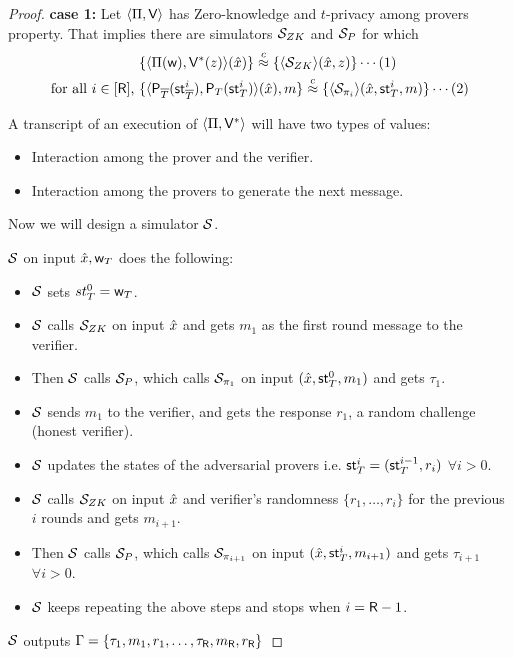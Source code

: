 \begin{proof}
	\textbf{case 1:} Let $\langle \Pi,\mathsf{V}\rangle$ has Zero-knowledge and $t$-privacy among provers property. That implies there are simulators $\mathcal{S}_{ZK}$ and $\mathcal{S}_{P}$ for which 
	\begin{align*}
		&\{ \langle  \Pi( \mathsf{w} ) , \mathsf{V}^*( z ) \rangle ( \hat{x}) \} \stackrel{c}{\approx} \{ \langle \mathcal{S}_{ZK} \rangle(\hat{x}, z) \} \cdots (1)\\		
		\text{for all }i \in [\mathsf{R}] \text{, } &\{ \langle  \mathsf{P}_{\overline{T}}( \mathsf{st}^i_{\overline{T}} ) , \mathsf{P}_T ( \mathsf{st}^i_T ) \rangle ( \hat{x} ) , m \}
	 \stackrel{c}{\approx} \{ \langle \mathcal{S}_{\pi_i} \rangle (\hat{x}, \mathsf{st}^i_T, m) \} \cdots (2)
	\end{align*}
	
	A transcript of an execution of $\langle \Pi,\mathsf{V}^*\rangle$ will have two types of values:

	\begin{itemize}
		\item Interaction among the prover and the verifier.
		\item Interaction among the provers to generate the next message.		
	\end{itemize}
	Now we will design a simulator $\mathcal{S}$.
	
	$\mathcal{S}$ on input $\hat{x}, \mathsf{w}_T$ does the following: 
	\begin{itemize}
		\item $\mathcal{S}$ sets $st^0_T = \mathsf{w}_T$.
		\item $\mathcal{S}$ calls $\mathcal{S}_{ZK}$ on input $\hat{x}$ and gets $m_{1}$ as the first round message to the verifier.
		\item Then $\mathcal{S}$ calls $\mathcal{S}_{P}$, which calls $\mathcal{S}_{\pi_1}$ on input $(\hat{x}, \mathsf{st}^0_T , m_{1})$ and gets $\tau_{1}$.
		\item $\mathcal{S}$ sends $m_1$ to the verifier, and gets the response $r_1$, a random challenge (honest verifier).
		\item $\mathcal{S}$ updates the states of the adversarial provers i.e. $\mathsf{st}^i_T = (\mathsf{st}^{i-1}_T, r_i)$ $\forall i>0$.
		\item $\mathcal{S}$ calls $\mathcal{S}_{ZK}$ on input $\hat{x}$ and verifier's randomness $\{r_1, \ldots, r_i\}$ for the previous $i$ rounds and gets $m_{i+1}$.
		\item Then $\mathcal{S}$ calls $\mathcal{S}_{P}$, which calls $\mathcal{S}_{\pi_{i+1}}$ on input $(\hat{x}, \mathsf{st}^{i}_T , m_{i+1})$ and gets $\tau_{i+1}$ $\forall i>0$. 
		\item $\mathcal{S}$ keeps repeating the above steps and stops when $i=\mathsf{R} - 1$. 
	\end{itemize}
$\mathcal{S}$ outputs $\Gamma = \{\tau_1, m_1 ,r_1, \ldots, \tau_{\mathsf{R}}, m_{\mathsf{R}}, r_{\mathsf{R}} \}$ 


\end{proof}
